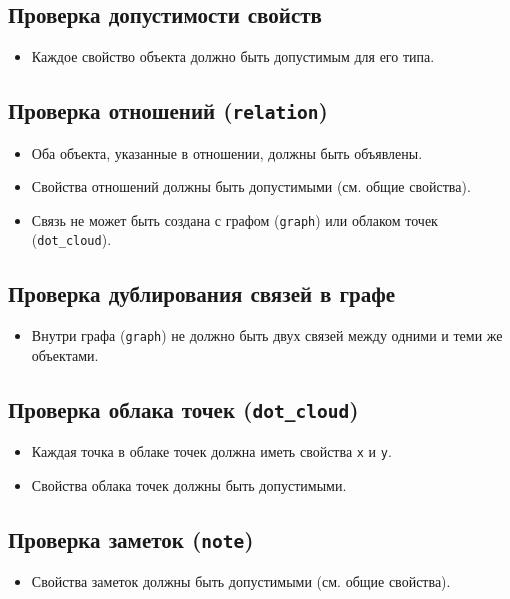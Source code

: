 \documentclass{article}
\begin{document}
\subsection{Проверка допустимости свойств}
\begin{itemize}
    \item Каждое свойство объекта должно быть допустимым для его типа.
\end{itemize}

\subsection{Проверка отношений (\texttt{relation})}
\begin{itemize}
    \item Оба объекта, указанные в отношении, должны быть объявлены.
    \item Свойства отношений должны быть допустимыми (см. общие свойства).
    \item Связь не может быть создана с графом (\texttt{graph}) или облаком точек (\texttt{dot\_cloud}).
\end{itemize}

\subsection{Проверка дублирования связей в графе}
\begin{itemize}
    \item Внутри графа (\texttt{graph}) не должно быть двух связей между одними и теми же объектами.
\end{itemize}

\subsection{Проверка облака точек (\texttt{dot\_cloud})}
\begin{itemize}
    \item Каждая точка в облаке точек должна иметь свойства \texttt{x} и \texttt{y}.
    \item Свойства облака точек должны быть допустимыми.
\end{itemize}

\subsection{Проверка заметок (\texttt{note})}
\begin{itemize}
    \item Свойства заметок должны быть допустимыми (см. общие свойства).
\end{itemize}
\end{document}
